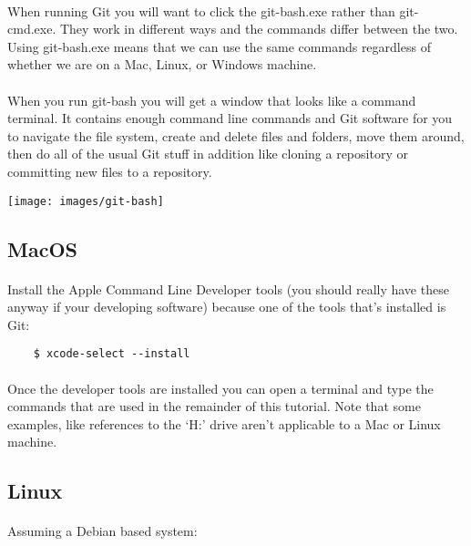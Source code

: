 \documentclass[10pt, a4paper]{article}
\begin{document}
\paragraph{} When running Git you will want to click the git-bash.exe rather than git-cmd.exe. They work in different ways and the commands differ between the two. Using git-bash.exe means that we can use the same commands regardless of whether we are on a Mac, Linux, or Windows machine.

\paragraph{} When you run git-bash you will get a window that looks like a command terminal. It contains enough command line commands and Git software for you to navigate the file system, create and delete files and folders, move them around, then do all of the usual Git stuff in addition like cloning a repository or committing new files to a repository.

\texttt{[image: images/git-bash]}


\subsection{MacOS}
\paragraph{} Install the Apple Command Line Developer tools (you should really have these anyway if your developing software) because one of the tools that's installed is Git:

\begin{lstlisting}
    $ xcode-select --install 
\end{lstlisting}

\paragraph{} Once the developer tools are installed you can open a terminal and type the commands that are used in the remainder of this tutorial. Note that some examples, like references to the `H:' drive aren't applicable to a Mac or Linux machine.

\subsection{Linux}
\paragraph{} Assuming a Debian based system:
\end{document}
